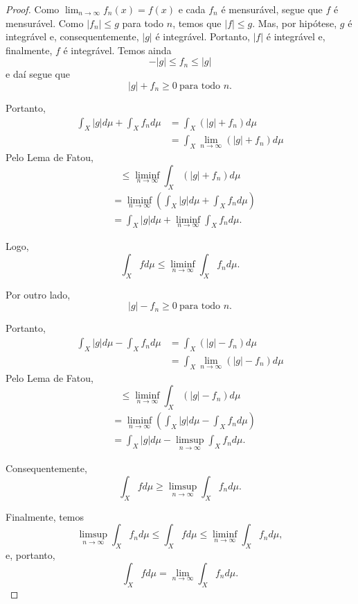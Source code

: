 \begin{proof}
    Como $\lim_{n \to \infty} f_n(x) = f(x)$ e cada $f_n$ é mensurável, segue que $f$ é mensurável. Como $|f_n| \leq g$ para todo $n$, temos que $|f| \leq g$. Mas, por hipótese, $g$ é integrável e, consequentemente, $|g|$ é integrável. Portanto, $|f|$ é integrável e, finalmente, $f$ é integrável. Temos ainda 
    \[
    -|g| \leq f_n \leq |g|
    \]
    e daí segue que 
    \[
    |g| + f_n \geq 0 \ \text{para todo } n.
    \]
    
    Portanto,
    \begin{align*}
    \int_X |g| d\mu + \int_X f_n d\mu &= \int_X (|g| + f_n) d\mu \\
    &= \int_X \lim_{n \to \infty} (|g| + f_n) d\mu
    \end{align*}
    Pelo Lema de Fatou,
    \[
    \leq \liminf_{n \to \infty} \int_X (|g| + f_n) d\mu
    \]
    \begin{align*}
    &= \liminf_{n \to \infty} \left( \int_X |g| d\mu + \int_X f_n d\mu \right) \\
    &= \int_X |g| d\mu + \liminf_{n \to \infty} \int_X f_n d\mu.
    \end{align*}
    
    Logo,
    \[
    \int_X f d\mu \leq \liminf_{n \to \infty} \int_X f_n d\mu.
    \]
    
    Por outro lado,
    \[
    |g| - f_n \geq 0 \ \text{para todo } n.
    \]
    
    Portanto,
    \begin{align*}
    \int_X |g| d\mu - \int_X f_n d\mu &= \int_X (|g| - f_n) d\mu \\
    &= \int_X \lim_{n \to \infty} (|g| - f_n) d\mu
    \end{align*}
    Pelo Lema de Fatou,
    \[
    \leq \liminf_{n \to \infty} \int_X (|g| - f_n) d\mu
    \]
    \begin{align*}
    &= \liminf_{n \to \infty} \left( \int_X |g| d\mu - \int_X f_n d\mu \right) \\
    &= \int_X |g| d\mu - \limsup_{n \to \infty} \int_X f_n d\mu.
    \end{align*}
    
    Consequentemente,
    \[
    \int_X f d\mu \geq \limsup_{n \to \infty} \int_X f_n d\mu.
    \]
    
    Finalmente, temos
    \[
    \limsup_{n \to \infty} \int_X f_n d\mu \leq \int_X f d\mu \leq \liminf_{n \to \infty} \int_X f_n d\mu,
    \]
    e, portanto,
    \[
    \int_X f d\mu = \lim_{n \to \infty} \int_X f_n d\mu.
    \]
\end{proof}
